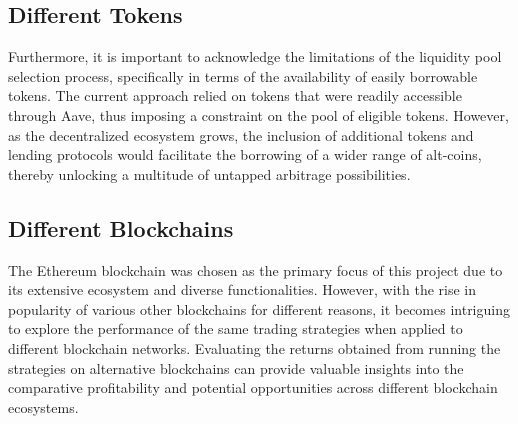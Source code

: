 \subsection{Different Tokens}
Furthermore, it is important to acknowledge the limitations of the liquidity pool selection process, specifically in terms of the availability of easily borrowable tokens. The current approach relied on tokens that were readily accessible through Aave, thus imposing a constraint on the pool of eligible tokens. However, as the decentralized ecosystem grows, the inclusion of additional tokens and lending protocols would facilitate the borrowing of a wider range of alt-coins, thereby unlocking a multitude of untapped arbitrage possibilities.

\subsection{Different Blockchains}
The Ethereum blockchain was chosen as the primary focus of this project due to its extensive ecosystem and diverse functionalities. However, with the rise in popularity of various other blockchains for different reasons, it becomes intriguing to explore the performance of the same trading strategies when applied to different blockchain networks. Evaluating the returns obtained from running the strategies on alternative blockchains can provide valuable insights into the comparative profitability and potential opportunities across different blockchain ecosystems.
